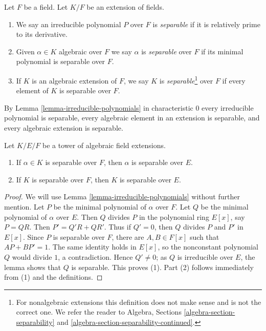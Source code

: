 \begin{definition}
\label{definition-separable}
Let $F$ be a field. Let $K/F$ be an extension of fields.
\begin{enumerate}
\item We say an irreducible polynomial $P$ over $F$ is {\it separable}
if it is relatively prime to its derivative.
\item Given $\alpha \in K$ algebraic over $F$ we say $\alpha$ is
{\it separable} over $F$ if its minimal polynomial is separable over $F$.
\item If $K$ is an algebraic extension of $F$, we say $K$ is
{\it separable}\footnote{For nonalgebraic extensions
this definition does not make sense and is not the correct one. We refer
the reader to Algebra, Sections \ref{algebra-section-separability} and
\ref{algebra-section-separability-continued}.}
over $F$ if every element of $K$ is separable over $F$.
\end{enumerate}
\end{definition}

\noindent
By Lemma \ref{lemma-irreducible-polynomials} in characteristic $0$ every
irreducible polynomial is separable, every algebraic element in an extension
is separable, and every algebraic extension is separable.

\begin{lemma}
\label{lemma-separable-goes-up}
Let $K/E/F$ be a tower of algebraic field extensions.
\begin{enumerate}
\item If $\alpha \in K$ is separable over $F$, then $\alpha$ is separable
over $E$.
\item If $K$ is separable over $F$, then $K$ is separable over $E$.
\end{enumerate}
\end{lemma}

\begin{proof}
We will use Lemma \ref{lemma-irreducible-polynomials} without further mention.
Let $P$ be the minimal polynomial of $\alpha$ over $F$.
Let $Q$ be the minimal polynomial of $\alpha$ over $E$.
Then $Q$ divides $P$ in the polynomial ring $E[x]$, say $P = QR$.
Then $P' = Q'R + QR'$. Thus if $Q' = 0$, then $Q$ divides $P$ and $P'$
in $E[x]$. Since $P$ is separable over $F$, there are
$A, B \in F[x]$ such that $AP + BP' = 1$. The same identity
holds in $E[x]$, so the nonconstant polynomial $Q$ would divide $1$,
a contradiction. Hence $Q' \not = 0$; as $Q$ is irreducible over $E$,
the lemma shows that $Q$ is separable. This proves (1). Part (2)
follows immediately from (1) and the definitions.
\end{proof}

